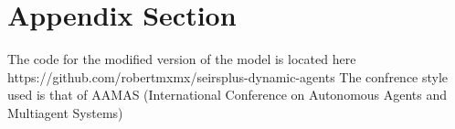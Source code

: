 \documentclass{article}
\begin{document}
\newpage
\appendix

\section{Appendix Section}
The code for the modified version of the model is located here https://github.com/robertmxmx/seirsplus-dynamic-agents
The confrence style used is that of AAMAS (International Conference on Autonomous Agents and Multiagent Systems) 


{}

\end{document}

